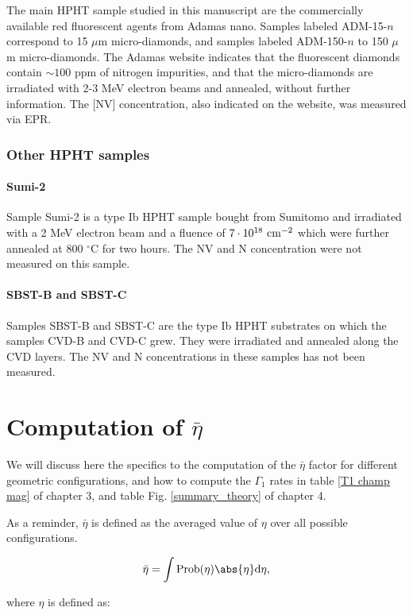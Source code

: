 \documentclass[a4paper, 11pt]{report}
\begin{document}
The main HPHT sample studied in this manuscript are the commercially available red fluorescent agents from Adamas nano. Samples labeled ADM-15-$n$ correspond to 15 $\mu$m micro-diamonds, and samples labeled ADM-150-$n$ to 150 $\mu$m micro-diamonds. The Adamas website indicates that the fluorescent diamonds contain $\sim 100$ ppm of nitrogen impurities, and that the micro-diamonds are irradiated with 2-3 MeV electron beams and annealed, without further information. The [NV] concentration, also indicated on the website, was measured via EPR.

\subsection{Other HPHT samples}
\subsubsection{Sumi-2}
Sample Sumi-2 is a type Ib HPHT sample bought from Sumitomo and irradiated with a 2 MeV electron beam and a fluence of $7\cdot 10^{18}\ \rm cm^{-2}$ which were further annealed at 800 $^\circ$C for two hours. The NV and N concentration were not measured on this sample.
\subsubsection{SBST-B and SBST-C}
Samples SBST-B and SBST-C are the type Ib HPHT substrates on which the samples CVD-B and CVD-C grew. They were irradiated and annealed along the CVD layers. The NV and N concentrations in these samples has not been measured.

\chapter{Computation of $\bar \eta$}
\label{Appendix eta}
We will discuss here the specifics to the computation of the  $\bar \eta$ factor for different geometric configurations, and how to compute the $\Gamma_1$ rates in table \ref{T1 champ mag} of chapter 3, and table Fig. \ref{summary_theory} of chapter 4.

As a reminder, $\bar \eta$ is defined as the averaged value of $\eta$ over all possible configurations.

\begin{equation}
\bar \eta = \int \rm{Prob}(\eta) \abs{\eta} d\eta,
\end{equation}

where $\eta$ is defined as:
\end{document}
